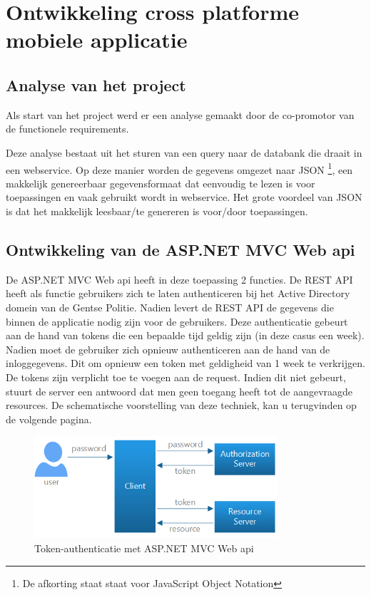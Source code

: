 \chapter{Ontwikkeling cross platforme mobiele applicatie}
\label{ch:ontwikkelingcrossplatformapp}
\section{Analyse van het project}
Als start van het project werd er een analyse gemaakt door de co-promotor van de functionele requirements.

Deze analyse bestaat uit het sturen van een query naar de databank die draait in een webservice.
Op deze manier worden de gegevens omgezet naar JSON \footnote{De afkorting staat \cite{inleidingtotjson} staat voor
JavaScript Object Notation}, een makkelijk genereerbaar gegevensformaat dat eenvoudig te lezen is voor toepassingen en vaak gebruikt wordt in webservice.  Het grote voordeel van JSON
is dat het makkelijk leesbaar/te genereren is voor/door toepassingen.

\section{Ontwikkeling van de ASP.NET MVC Web api}
De ASP.NET MVC Web api heeft in deze toepassing 2 functies. De REST API heeft als functie gebruikers zich te laten
authenticeren bij het Active Directory domein van de Gentse Politie. Nadien levert de REST API de gegevens die binnen
de applicatie nodig zijn voor de gebruikers. Deze authenticatie gebeurt aan de hand van tokens die een bepaalde tijd geldig zijn
(in deze casus een week). Nadien moet de gebruiker zich opnieuw authenticeren aan de hand van de inloggegevens. Dit om opnieuw een
token met geldigheid van 1 week te verkrijgen. De tokens zijn verplicht toe te voegen aan de request. Indien dit niet gebeurt, stuurt
de server een antwoord dat men geen toegang heeft tot de aangevraagde resources. De schematische voorstelling van deze techniek,
kan u terugvinden op de volgende pagina.

\begin{figure}[ht!]
\centering
\caption{Token-authenticatie met ASP.NET MVC Web api}
\includegraphics[width=90mm]{./img/authentication.png}
\end{figure}


